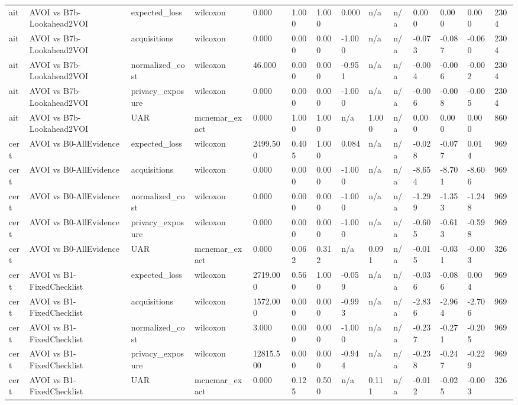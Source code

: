 \begin{table}[!ht]
{\begin{tabular}{llllllllllllll}
ait & AVOI vs B7b-Lookahead2VOI & expected\_loss & wilcoxon & 0.000 & 1.000 & 1.000 & 0.000 & n/a & n/a & 0.000 & 0.000 & 0.000 & 2304 \\
ait & AVOI vs B7b-Lookahead2VOI & acquisitions & wilcoxon & 0.000 & 0.000 & 0.000 & -1.000 & n/a & n/a & -0.073 & -0.087 & -0.060 & 2304 \\
ait & AVOI vs B7b-Lookahead2VOI & normalized\_cost & wilcoxon & 46.000 & 0.000 & 0.000 & -0.951 & n/a & n/a & -0.004 & -0.006 & -0.002 & 2304 \\
ait & AVOI vs B7b-Lookahead2VOI & privacy\_exposure & wilcoxon & 0.000 & 0.000 & 0.000 & -1.000 & n/a & n/a & -0.006 & -0.008 & -0.005 & 2304 \\
ait & AVOI vs B7b-Lookahead2VOI & UAR & mcnemar\_exact & 0.000 & 1.000 & 1.000 & n/a & 1.000 & n/a & 0.000 & 0.000 & 0.000 & 860 \\
cert & AVOI vs B0-AllEvidence & expected\_loss & wilcoxon & 2499.500 & 0.405 & 1.000 & 0.084 & n/a & n/a & -0.028 & -0.077 & 0.014 & 969 \\
cert & AVOI vs B0-AllEvidence & acquisitions & wilcoxon & 0.000 & 0.000 & 0.000 & -1.000 & n/a & n/a & -8.654 & -8.701 & -8.606 & 969 \\
cert & AVOI vs B0-AllEvidence & normalized\_cost & wilcoxon & 0.000 & 0.000 & 0.000 & -1.000 & n/a & n/a & -1.299 & -1.353 & -1.248 & 969 \\
cert & AVOI vs B0-AllEvidence & privacy\_exposure & wilcoxon & 0.000 & 0.000 & 0.000 & -1.000 & n/a & n/a & -0.605 & -0.613 & -0.598 & 969 \\
cert & AVOI vs B0-AllEvidence & UAR & mcnemar\_exact & 0.000 & 0.062 & 0.312 & n/a & 0.091 & n/a & -0.015 & -0.031 & -0.003 & 326 \\
cert & AVOI vs B1-FixedChecklist & expected\_loss & wilcoxon & 2719.000 & 0.560 & 1.000 & -0.059 & n/a & n/a & -0.036 & -0.086 & 0.004 & 969 \\
cert & AVOI vs B1-FixedChecklist & acquisitions & wilcoxon & 1572.000 & 0.000 & 0.000 & -0.993 & n/a & n/a & -2.836 & -2.964 & -2.706 & 969 \\
cert & AVOI vs B1-FixedChecklist & normalized\_cost & wilcoxon & 3.000 & 0.000 & 0.000 & -1.000 & n/a & n/a & -0.237 & -0.271 & -0.205 & 969 \\
cert & AVOI vs B1-FixedChecklist & privacy\_exposure & wilcoxon & 12815.500 & 0.000 & 0.000 & -0.944 & n/a & n/a & -0.238 & -0.247 & -0.229 & 969 \\
cert & AVOI vs B1-FixedChecklist & UAR & mcnemar\_exact & 0.000 & 0.125 & 0.500 & n/a & 0.111 & n/a & -0.012 & -0.025 & -0.003 & 326 \\

\end{tabular}}
\end{table}
